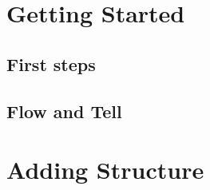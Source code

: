 \usepackage{lipsum}


\newcommand{\keyword}[1]{\textcolor{blue}{#1}}




\coverpage{\TITLE}{\SUBTITLE}{\AUTHOR}{\DATE}{\SUBJECT}
\newpage
\tableofcontents

\part{Getting Started}
\newpage
\chapter{First steps} \label{ch:first}



\newpage
\chapter{Flow and Tell}\label{ch:flow}




\part{Adding Structure}
\newpage
